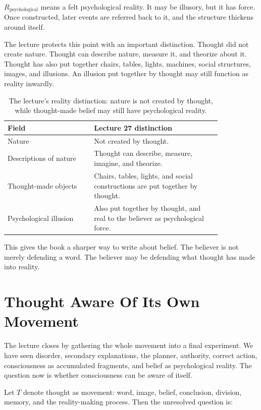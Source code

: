 \documentclass[11pt,oneside]{book}
\begin{document}
\(R_{\mathrm{psychological}}\) means a felt psychological reality. It may be illusory, but it has force. Once constructed, later events are referred back to it, and the structure thickens around itself.

The lecture protects this point with an important distinction. Thought did not create nature. Thought can describe nature, measure it, and theorize about it. Thought has also put together chairs, tables, lights, machines, social structures, images, and illusions. An illusion put together by thought may still function as reality inwardly.

\begin{table}
\centering
\begin{tabular}{|p{0.34\linewidth}|p{0.50\linewidth}|}
\hline
\textbf{Field} & \textbf{Lecture 27 distinction} \\
\hline
Nature & Not created by thought. \\
\hline
Descriptions of nature & Thought can describe, measure, imagine, and theorize. \\
\hline
Thought-made objects & Chairs, tables, lights, and social constructions are put together by thought. \\
\hline
Psychological illusion & Also put together by thought, and real to the believer as psychological force. \\
\hline
\end{tabular}
\caption{The lecture's reality distinction: nature is not created by thought, while thought-made belief may still have psychological reality.}
\end{table}

This gives the book a sharper way to write about belief. The believer is not merely defending a word. The believer may be defending what thought has made into reality.

\section{Thought Aware Of Its Own Movement}

The lecture closes by gathering the whole movement into a final experiment. We have seen disorder, secondary explanations, the planner, authority, correct action, consciousness as accumulated fragments, and belief as psychological reality. The question now is whether consciousness can be aware of itself.

Let \(T\) denote thought as movement: word, image, belief, conclusion, division, memory, and the reality-making process. Then the unresolved question is:
\end{document}
